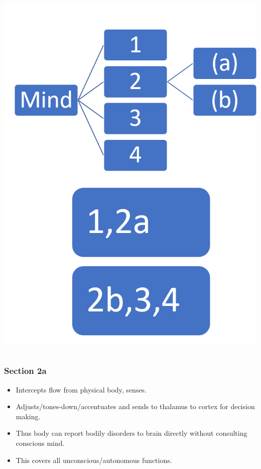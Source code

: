 \begin{frame}[fragile]
\begin{columns}[T]
\begin{column}{.48\textwidth}
\begin{center}
\includegraphics[width=0.9\linewidth,keepaspectratio]{images/zenyoga1}
\end{center}

\end{column}%
\end{columns}
\end{frame}

\begin{frame}[fragile]
\frametitle{Section 2a}
\begin{itemize}
\item Intercepts flow from physical body, senses.
\item Adjusts/tones-down/accentuates and sends to thalamus to cortex for decision making.
\item Thus body can report bodily disorders to brain directly without consulting conscious mind.
\item This covers all unconscious/autonomous functions.
\end{itemize}
\end{frame}

